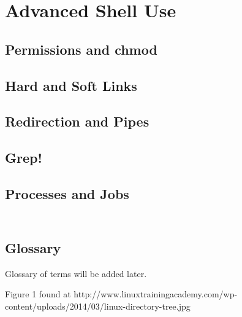 \documentclass{book}
\begin{document}
\chapter{Advanced Shell Use}
\section{Permissions and chmod}
\section{Hard and Soft Links}
\section{Redirection and Pipes}
\section{Grep!}
\section{Processes and Jobs}

\newpage
\section{\\Glossary} \label{App:AppendixB}

Glossary of terms will be added later.

\newpage
\begin{thebibliography}{10}

	 Figure 1 found at http://www.linuxtrainingacademy.com/wp-content/uploads/2014/03/linux-directory-tree.jpg \\

\end{thebibliography}
\end{document}
